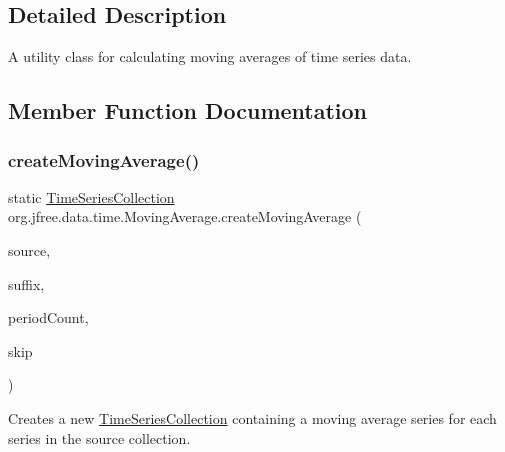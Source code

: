 \subsection{Detailed Description}
A utility class for calculating moving averages of time series data. 

\subsection{Member Function Documentation}
\mbox{\label{classorg_1_1jfree_1_1data_1_1time_1_1_moving_average_af22d5280cf3f80e287b9615029470bb3}} 
\subsubsection{\texorpdfstring{create\+Moving\+Average()}{createMovingAverage()}\hspace{0.1cm}{\footnotesize\ttfamily [1/5]}}
{\footnotesize\ttfamily static \mbox{\hyperlink{classorg_1_1jfree_1_1data_1_1time_1_1_time_series_collection}{Time\+Series\+Collection}} org.\+jfree.\+data.\+time.\+Moving\+Average.\+create\+Moving\+Average (\begin{DoxyParamCaption}\item[{\mbox{\hyperlink{classorg_1_1jfree_1_1data_1_1time_1_1_time_series_collection}{Time\+Series\+Collection}}}]{source,  }\item[{String}]{suffix,  }\item[{int}]{period\+Count,  }\item[{int}]{skip }\end{DoxyParamCaption})\hspace{0.3cm}{\ttfamily [static]}}

Creates a new \mbox{\hyperlink{classorg_1_1jfree_1_1data_1_1time_1_1_time_series_collection}{Time\+Series\+Collection}} containing a moving average series for each series in the source collection.


